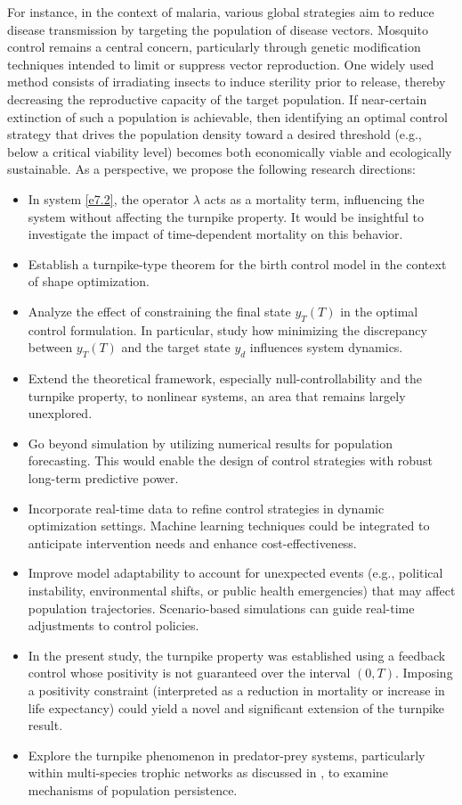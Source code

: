 \documentclass[10pt, a4]{amsart}
\theoremstyle{plain}
\theoremstyle{definition}
\theoremstyle{remark}
\numberwithin{equation}{section}
\begin{document}
For instance, in the context of malaria, various global strategies aim to reduce disease transmission by targeting the population of disease vectors. Mosquito control remains a central concern, particularly through genetic modification techniques intended to limit or suppress vector reproduction. One widely used method consists of irradiating insects to induce sterility prior to release, thereby decreasing the reproductive capacity of the target population. If near-certain extinction of such a population is achievable, then identifying an optimal control strategy that drives the population density toward a desired threshold (e.g., below a critical viability level) becomes both economically viable and ecologically sustainable. As a perspective, we propose the following research directions:
\begin{itemize}
\item In system \eqref{e7.2}, the operator $\lambda$ acts as a mortality term, influencing the system without affecting the turnpike property. It would be insightful to investigate the impact of time-dependent mortality on this behavior.
\item Establish a turnpike-type theorem for the birth control model in the context of shape optimization.
\item Analyze the effect of constraining the final state $y_T(T)$ in the optimal control formulation. In particular, study how minimizing the discrepancy between $y_T(T)$ and the target state $y_d$ influences system dynamics.
\item Extend the theoretical framework, especially null-controllability and the turnpike property, to nonlinear systems, an area that remains largely unexplored.
\item Go beyond simulation by utilizing numerical results for population forecasting. This would enable the design of control strategies with robust long-term predictive power.
\item Incorporate real-time data to refine control strategies in dynamic optimization settings. Machine learning techniques could be integrated to anticipate intervention needs and enhance cost-effectiveness.
\item Improve model adaptability to account for unexpected events (e.g., political instability, environmental shifts, or public health emergencies) that may affect population trajectories. Scenario-based simulations can guide real-time adjustments to control policies.
\item In the present study, the turnpike property was established using a feedback control whose positivity is not guaranteed over the interval $(0,T)$. Imposing a positivity constraint (interpreted as a reduction in mortality or increase in life expectancy) could yield a novel and significant extension of the turnpike result.
\item Explore the turnpike phenomenon in predator-prey systems, particularly within multi-species trophic networks as discussed in \cite{ref74}, to examine mechanisms of population persistence.
\end{itemize}
\end{document}
